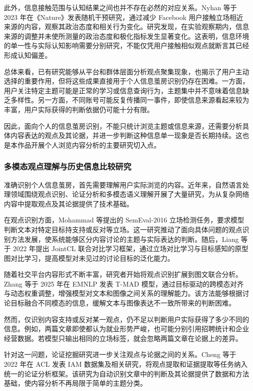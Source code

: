 此外，信息接触范围与认知结果之间也并不存在必然的对应关系。Nyhan 等于 2023 年在《Nature》发表随机干预研究，通过减少 Facebook 用户接触立场相近来源的内容，观察其政治态度和相关行为变化\cite{ref5}。研究发现，在实验观察期内，信息来源的调整并未使所测量的政治态度和极化指标发生显著变化。这表明，信息环境的单一性与实际认知影响需要分别研究，不能仅凭用户接触相似观点就断言其已经形成认知偏差。

总体来看，已有研究能够从平台和群体层面分析观点聚集现象，也揭示了用户主动选择的重要作用，但将这些成果直接用于个人信息茧房识别仍存在困难。一方面，用户关注特定主题可能是正常的学习或信息查询行为，主题集中并不意味着信息缺乏多样性。另一方面，不同账号可能反复传播同一事件，即使信息来源看起来较为丰富，用户实际获得的判断依据仍可能十分有限。

因此，面向个人的信息茧房识别，不能只统计浏览主题或信息来源，还需要分析具体内容表达的观点及其论据，并进一步判断这种信息单一现象是否长期持续。这也是本作品开展个人浏览内容分析的主要研究切入点。

\subsubsection{多模态观点理解与历史信息比较研究}\label{section:1.3.2}

准确识别个人信息茧房，首先需要理解用户实际浏览的内容。近年来，自然语言处理领域围绕观点识别、论证分析和多模态语义理解开展了大量研究，为从复杂网络内容中提取观点及其论据提供了技术基础。

在观点识别方面，Mohammad 等提出的 SemEval-2016 立场检测任务，要求模型判断文本对特定目标持支持或反对等立场\cite{ref8}。这一研究推动了面向具体问题的观点识别方法发展，使系统能够区分内容讨论的主题与实际表达的判断。随后，Liang 等于 2022 年提出 JointCL 联合对比学习框架，通过立场对比学习与目标感知的原型图对比学习，提高模型对未见过的讨论目标的泛化能力\cite{ref15}。

随着社交平台内容形式不断丰富，研究者开始将观点识别扩展到图文联合分析。Zhang 等于 2025 年在 EMNLP 发表 T-MAD 模型，通过目标驱动的跨模态对齐与动态权重调整，增强模型对文本和图像之间关系的理解能力\cite{ref14}。该方法能够根据讨论目标融合不同模态的信息，缓解文本与图像表达不一致所带来的判断困难。

然而，仅识别内容支持或反对某一观点，仍不足以判断用户实际获得了多少不同的信息。例如，两篇文章即使都认为就业形势严峻，也可能分别引用招聘统计和企业经营数据。若模型只输出相同的立场标签，就会忽略两篇文章在论据上的差异。

针对这一问题，论证挖掘研究进一步关注观点与论据之间的关系。Cheng 等于 2022 年在 ACL 发表 IAM 数据集及相关研究，将观点提取和证据提取等任务纳入统一的论证分析框架\cite{ref13}。该研究为自动识别文章中的判断及其论据提供了数据和方法基础，使内容分析不再局限于简单的主题分类。

